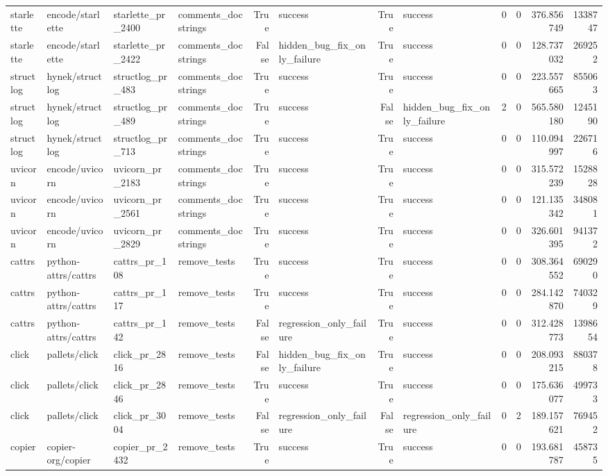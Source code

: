 \begin{tabular}{llllrlrlrrrr}
starlette & encode/starlette & starlette\_pr\_2400 & comments\_docstrings & True & success & True & success & 0 & 0 & 376.856749 & 1338747 \\
starlette & encode/starlette & starlette\_pr\_2422 & comments\_docstrings & False & hidden\_bug\_fix\_only\_failure & True & success & 0 & 0 & 128.737032 & 269252 \\
structlog & hynek/structlog & structlog\_pr\_483 & comments\_docstrings & True & success & True & success & 0 & 0 & 223.557665 & 855063 \\
structlog & hynek/structlog & structlog\_pr\_489 & comments\_docstrings & True & success & False & hidden\_bug\_fix\_only\_failure & 2 & 0 & 565.580180 & 1245190 \\
structlog & hynek/structlog & structlog\_pr\_713 & comments\_docstrings & True & success & True & success & 0 & 0 & 110.094997 & 226716 \\
uvicorn & encode/uvicorn & uvicorn\_pr\_2183 & comments\_docstrings & True & success & True & success & 0 & 0 & 315.572239 & 1528828 \\
uvicorn & encode/uvicorn & uvicorn\_pr\_2561 & comments\_docstrings & True & success & True & success & 0 & 0 & 121.135342 & 348081 \\
uvicorn & encode/uvicorn & uvicorn\_pr\_2829 & comments\_docstrings & True & success & True & success & 0 & 0 & 326.601395 & 941372 \\
cattrs & python-attrs/cattrs & cattrs\_pr\_108 & remove\_tests & True & success & True & success & 0 & 0 & 308.364552 & 690290 \\
cattrs & python-attrs/cattrs & cattrs\_pr\_117 & remove\_tests & True & success & True & success & 0 & 0 & 284.142870 & 740329 \\
cattrs & python-attrs/cattrs & cattrs\_pr\_142 & remove\_tests & False & regression\_only\_failure & True & success & 0 & 0 & 312.428773 & 1398654 \\
click & pallets/click & click\_pr\_2816 & remove\_tests & False & hidden\_bug\_fix\_only\_failure & True & success & 0 & 0 & 208.093215 & 880378 \\
click & pallets/click & click\_pr\_2846 & remove\_tests & True & success & True & success & 0 & 0 & 175.636077 & 499733 \\
click & pallets/click & click\_pr\_3004 & remove\_tests & False & regression\_only\_failure & False & regression\_only\_failure & 0 & 2 & 189.157621 & 769452 \\
copier & copier-org/copier & copier\_pr\_2432 & remove\_tests & True & success & True & success & 0 & 0 & 193.681787 & 458735 \\

\end{tabular}

